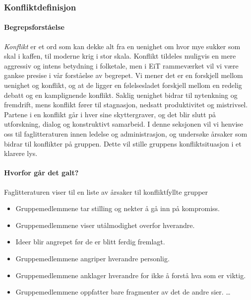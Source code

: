 \subsubsection{Konfliktdefinisjon}

\paragraph{Begrepsforståelse}
\emph{Konflikt} er et ord som kan dekke alt fra en uenighet om hvor mye sukker som skal i kaffen, til moderne krig i stor skala. Konflikt tildeles muligvis en mere aggressiv og intens betydning i folketale, men i EiT rammeværket vil vi være gankse presise i vår forståelse av begrepet. Vi mener det er en forskjell mellom uenighet og konflikt, og at de ligger en følelsesladet forskjell mellom en redelig debatt og en kamplignende konflikt. Saklig uenighet bidrar til nytenkning og fremdrift, mens konflikt fører til stagnasjon, nedsatt produktivitet og mistrivsel\cite{ledernytt}. Partene i en konflikt går i hver sine skyttergraver, og det blir slutt på utforskning, dialog og konstruktivt samarbeid. I denne seksjonen vil vi henvise oss til faglitteraturen innen ledelse og administrasjon, og undersøke årsaker som bidrar til konflikter på gruppen. Dette vil stille gruppens konfliktsituasjon i et klarere lys. 

\paragraph{Hvorfor går det galt?}

Faglitteraturen viser til en liste av årsaker til konfliktfyllte grupper\cite[p.~253]{orgorg}

\begin{itemize}

  \item Gruppemedlemmene tar stilling og nekter å gå inn på kompromiss.
  \item Gruppemedlemmene viser utålmodighet overfor hverandre.  
  \item Ideer blir angrepet før de er blitt ferdig fremlagt.
  \item Gruppemedlemmene angriper hverandre personlig.
  \item Gruppemedlemmene anklager hverandre for ikke å forstå hva som er viktig.
  \item Gruppemedlemmene oppfatter bare fragmenter av det de andre sier.  
\ldots
\end{itemize}

